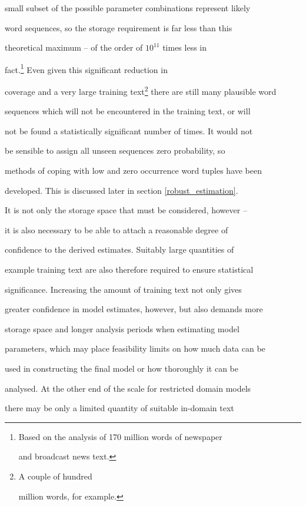 small subset of the possible parameter combinations represent likely


word sequences, so the storage requirement is far less than this


theoretical maximum -- of the order of $10^{11}$ times less in


fact.\footnote{Based on the analysis of 170 million words of newspaper


and broadcast news text.}  Even given this significant reduction in


coverage and a very large training text\footnote{A couple of hundred


million words, for example.} there are still many plausible word


sequences which will not be encountered in the training text, or will


not be found a statistically significant number of times. It would not


be sensible to assign all unseen sequences zero probability, so


methods of coping with low and zero occurrence word tuples have been


developed. This is discussed later in section \ref{robust_estimation}.





It is not only the storage space that must be considered, however --


it is also necessary to be able to attach a reasonable degree of


confidence to the derived estimates. Suitably large quantities of


example training text are also therefore required to ensure statistical


significance.  Increasing the amount of training text not only gives


greater confidence in model estimates, however, but also demands more


storage space and longer analysis periods when estimating model


parameters, which may place feasibility limits on how much data can be


used in constructing the final model or how thoroughly it can be


analysed. At the other end of the scale for restricted domain models


there may be only a limited quantity of suitable in-domain text


